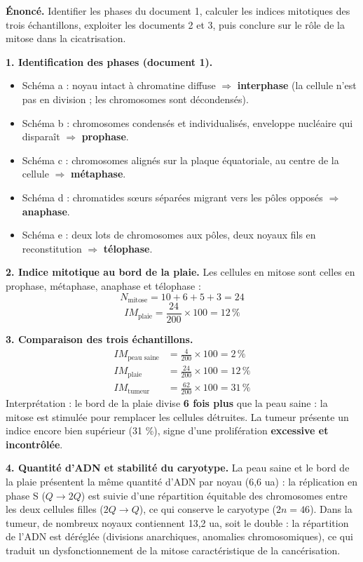 \documentclass[11pt]{article}
\begin{document}
\begin{exoresolu}
\textbf{Énoncé.} Identifier les phases du document 1, calculer les indices mitotiques des trois échantillons, exploiter les documents 2 et 3, puis conclure sur le rôle de la mitose dans la cicatrisation.

\tcblower
\textbf{1. Identification des phases (document 1).}
\begin{itemize}
\item Schéma a : noyau intact à chromatine diffuse $\Rightarrow$ \textbf{interphase} (la cellule n'est pas en division ; les chromosomes sont décondensés).
\item Schéma b : chromosomes condensés et individualisés, enveloppe nucléaire qui disparaît $\Rightarrow$ \textbf{prophase}.
\item Schéma c : chromosomes alignés sur la plaque équatoriale, au centre de la cellule $\Rightarrow$ \textbf{métaphase}.
\item Schéma d : chromatides sœurs séparées migrant vers les pôles opposés $\Rightarrow$ \textbf{anaphase}.
\item Schéma e : deux lots de chromosomes aux pôles, deux noyaux fils en reconstitution $\Rightarrow$ \textbf{télophase}.
\end{itemize}

\textbf{2. Indice mitotique au bord de la plaie.} Les cellules en mitose sont celles en prophase, métaphase, anaphase et télophase :
\[ N_{\text{mitose}} = 10 + 6 + 5 + 3 = 24 \]
\[ IM_{\text{plaie}} = \frac{24}{200} \times 100 = 12\,\% \]

\textbf{3. Comparaison des trois échantillons.}
\begin{align*}
IM_{\text{peau saine}} &= \frac{4}{200} \times 100 = 2\,\% \\
IM_{\text{plaie}} &= \frac{24}{200} \times 100 = 12\,\% \\
IM_{\text{tumeur}} &= \frac{62}{200} \times 100 = 31\,\%
\end{align*}
Interprétation : le bord de la plaie divise \textbf{6 fois plus} que la peau saine : la mitose est stimulée pour remplacer les cellules détruites. La tumeur présente un indice encore bien supérieur (31 \%), signe d'une prolifération \textbf{excessive et incontrôlée}.

\textbf{4. Quantité d'ADN et stabilité du caryotype.} La peau saine et le bord de la plaie présentent la même quantité d'ADN par noyau (6,6 ua) : la réplication en phase S ($Q \to 2Q$) est suivie d'une répartition équitable des chromosomes entre les deux cellules filles ($2Q \to Q$), ce qui conserve le caryotype ($2n = 46$). Dans la tumeur, de nombreux noyaux contiennent 13,2 ua, soit le double : la répartition de l'ADN est déréglée (divisions anarchiques, anomalies chromosomiques), ce qui traduit un dysfonctionnement de la mitose caractéristique de la cancérisation.


\end{exoresolu}
\end{document}

